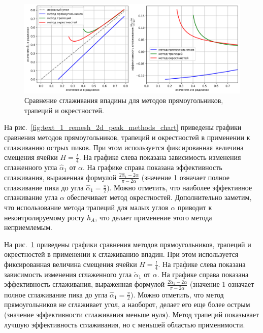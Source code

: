 \documentclass[a4paper,14pt]{extarticle}                     %
\theoremstyle{plain}                                         %
\begin{document}
\begin{figure}[!ht]
\centering
\includegraphics[width=1.0\textwidth]{./pics/text_1_remesh_2d/cavern-methods-chart.png}
\singlespacing
{}\caption{Сравнение сглаживания впадины для методов прямоугольников, трапеций и окрестностей.}
\label{fig:text_1_remesh_2d_cavern_methods_chart}
\end{figure}

На рис.~\ref{fig:text_1_remesh_2d_peak_methods_chart} приведены графики сравнения методов прямоугольников, трапеций и окрестностей в применении к сглаживанию острых пиков.
При этом используется фиксированная величина смещения ячейки $H = \frac{l}{4}$.
На графике слева показана зависимость изменения сглаженного угла $\hat{\alpha}_1$ от $\alpha$.
На графике справа показана эффективность сглаживания, выраженная формулой $\frac{2 \hat{\alpha}_1 - 2 \alpha}{\pi - 2 \alpha}$ (значение 1 означает полное сглаживание пика до угла $\hat{\alpha}_1 = \frac{\pi}{2}$).
Можно отметить, что наиболее эффективное сглаживание угла $\alpha$ обеспечивает метод окрестностей.
Дополнительно заметим, что использование метода трапеций для малых углов $\alpha$ приводит к неконтролируемому росту $h_A$, что делает применение этого метода неприемлемым.

На рис.~\ref{fig:text_1_remesh_2d_cavern_methods_chart} приведены графики сравнения методов прямоугольников, трапеций и окрестностей в применении к сглаживанию впадин.
При этом используется фиксированная величина смещения ячейки $H = \frac{l}{4}$.
На графике слева показана зависимость изменения сглаженного угла $\check{\alpha}_1$ от $\alpha$.
На графике справа показана эффективность сглаживания, выраженная формулой $\frac{2 \check{\alpha}_1 - 2 \alpha}{\pi - 2 \alpha}$ (значение 1 означает полное сглаживание пика до угла $\hat{\alpha}_1 = \frac{\pi}{2}$).
Можно отметить, что метод прямоугольников не сглаживает угол, а наоборот, делает его еще более острым (значение эффективности сглаживания меньше нуля).
Метод трапеций показывает лучшую эффективность сглаживания, но с меньшей областью применимости.
\end{document}
